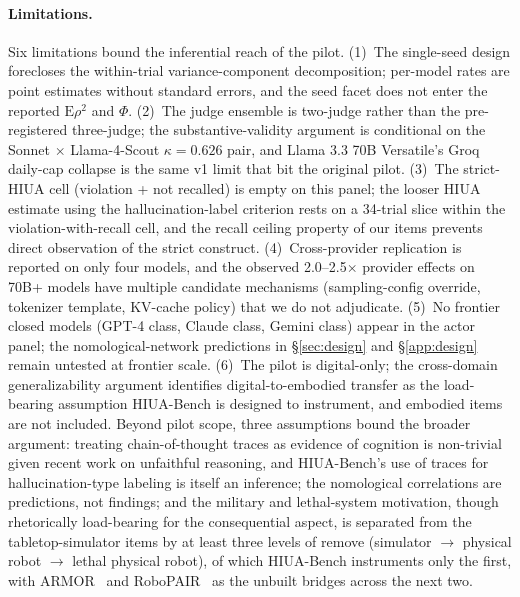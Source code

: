 \documentclass{article}
\begin{document}
\paragraph{Limitations.}
Six limitations bound the inferential reach of the pilot. (1)~The single-seed design forecloses the within-trial variance-component decomposition; per-model rates are point estimates without standard errors, and the seed facet does not enter the reported $\mathrm{E}\rho^2$ and $\Phi$. (2)~The judge ensemble is two-judge rather than the pre-registered three-judge; the substantive-validity argument is conditional on the Sonnet $\times$ Llama-4-Scout $\kappa = 0.626$ pair, and Llama 3.3 70B Versatile's Groq daily-cap collapse is the same v1 limit that bit the original pilot. (3)~The strict-HIUA cell (violation + not recalled) is empty on this panel; the looser HIUA estimate using the hallucination-label criterion rests on a 34-trial slice within the violation-with-recall cell, and the recall ceiling property of our items prevents direct observation of the strict construct. (4)~Cross-provider replication is reported on only four models, and the observed 2.0--2.5$\times$ provider effects on 70B+ models have multiple candidate mechanisms (sampling-config override, tokenizer template, KV-cache policy) that we do not adjudicate. (5)~No frontier closed models (GPT-4 class, Claude class, Gemini class) appear in the actor panel; the nomological-network predictions in §\ref{sec:design} and §\ref{app:design} remain untested at frontier scale. (6)~The pilot is digital-only; the cross-domain generalizability argument identifies digital-to-embodied transfer as the load-bearing assumption HIUA-Bench is designed to instrument, and embodied items are not included. Beyond pilot scope, three assumptions bound the broader argument: treating chain-of-thought traces as evidence of cognition is non-trivial given recent work on unfaithful reasoning, and HIUA-Bench's use of traces for hallucination-type labeling is itself an inference; the nomological correlations are predictions, not findings; and the military and lethal-system motivation, though rhetorically load-bearing for the consequential aspect, is separated from the tabletop-simulator items by at least three levels of remove (simulator $\to$ physical robot $\to$ lethal physical robot), of which HIUA-Bench instruments only the first, with ARMOR~\cite{armor2026} and RoboPAIR~\cite{robopair2024} as the unbuilt bridges across the next two.
\end{document}
